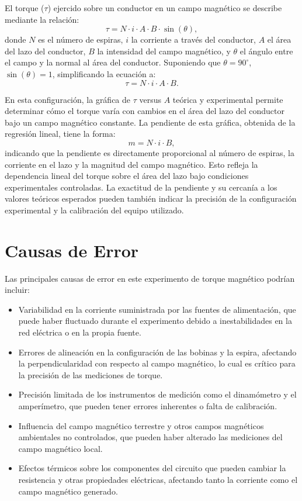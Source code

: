 El torque (\(\tau\)) ejercido sobre un conductor en un campo magnético se describe mediante la relación:
\[
\tau = N \cdot i \cdot A \cdot B \cdot \sin(\theta),
\]
donde \(N\) es el número de espiras, \(i\) la corriente a través del conductor, \(A\) el área del lazo del conductor, \(B\) la intensidad del campo magnético, y \(\theta\) el ángulo entre el campo y la normal al área del conductor. Suponiendo que \(\theta = 90^\circ\), \(\sin(\theta) = 1\), simplificando la ecuación a:
\[
\tau = N \cdot i \cdot A \cdot B.
\]

En esta configuración, la gráfica de \(\tau\) versus \(A\) teórica y experimental permite determinar cómo el torque varía con cambios en el área del lazo del conductor bajo un campo magnético constante. La pendiente de esta gráfica, obtenida de la regresión lineal, tiene la forma:
\[
m = N \cdot i \cdot B,
\]
indicando que la pendiente es directamente proporcional al número de espiras, la corriente en el lazo y la magnitud del campo magnético. Esto refleja la dependencia lineal del torque sobre el área del lazo bajo condiciones experimentales controladas. La exactitud de la pendiente y su cercanía a los valores teóricos esperados pueden también indicar la precisión de la configuración experimental y la calibración del equipo utilizado.

\section{Causas de Error}
Las principales causas de error en este experimento de torque magnético podrían incluir:
\begin{itemize}
    \item Variabilidad en la corriente suministrada por las fuentes de alimentación, que puede haber fluctuado durante el experimento debido a inestabilidades en la red eléctrica o en la propia fuente.
    \item Errores de alineación en la configuración de las bobinas y la espira, afectando la perpendicularidad con respecto al campo magnético, lo cual es crítico para la precisión de las mediciones de torque.
    \item Precisión limitada de los instrumentos de medición como el dinamómetro y el amperímetro, que pueden tener errores inherentes o falta de calibración.
    \item Influencia del campo magnético terrestre y otros campos magnéticos ambientales no controlados, que pueden haber alterado las mediciones del campo magnético local.
    \item Efectos térmicos sobre los componentes del circuito que pueden cambiar la resistencia y otras propiedades eléctricas, afectando tanto la corriente como el campo magnético generado.
\end{itemize}

